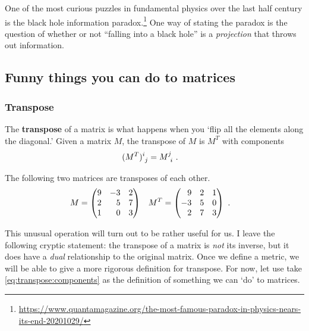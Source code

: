 \documentclass[12pt]{article}
\begin{document}
\begin{example}
One of the most curious puzzles in fundamental physics over the last half century is the black hole information paradox.\footnote{\url{https://www.quantamagazine.org/the-most-famous-paradox-in-physics-nears-its-end-20201029/}} One way of stating the paradox is the question of whether or not ``falling into a black hole'' is a \emph{projection} that throws out information. 
\end{example}

\subsection{Funny things you can do to matrices}
\label{sec:transpose:trace:det}

\subsubsection*{Transpose}

The \textbf{transpose} of a matrix is what happens when you `flip all the elements along the diagonal.' Given a matrix $M$, the transpose of $M$ is $M^T$ with components
\begin{align}
    (M^T)\aij{i}{j} &= M\aij{j}{i} \ .
    \label{eq:transpose:components}
\end{align}

\begin{example}
The following two matrices are transposes of each other.
\begin{align}
    M &= 
    \begin{pmatrix}
        9 & -3 & 2 \\
        2 & \pp 5 & 7 \\
        1 & \pp 0 & 3
    \end{pmatrix}
    &
    M^T &= 
    \begin{pmatrix}
        \pp 9 & 2 & 1 \\
        -3 & 5 & 0 \\
        \pp 2 & 7 & 3
    \end{pmatrix}
    \ .
\end{align}
\end{example}

This unusual operation will turn out to be rather useful for us. I leave the following cryptic statement: the transpose of a matrix is \emph{not} its inverse, but it does have a \emph{dual} relationship to the original matrix. Once we define a metric, we will be able to give a more rigorous definition for transpose. For now, let use take \eqref{eq:transpose:components} as the definition of something we can `do' to matrices. 
\end{document}
